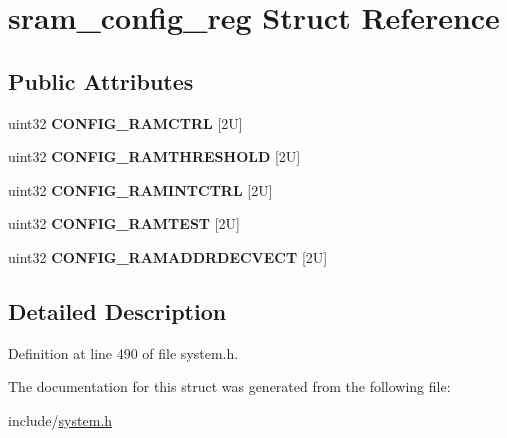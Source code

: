 \hypertarget{structsram__config__reg}{}\section{sram\+\_\+config\+\_\+reg Struct Reference}
\label{structsram__config__reg}
\subsection*{Public Attributes}
\begin{DoxyCompactItemize}
\item 
\mbox{\label{structsram__config__reg_ac6faa15604d9d8ac7da15f410c0e0f5f}} 
uint32 {\bfseries C\+O\+N\+F\+I\+G\+\_\+\+R\+A\+M\+C\+T\+RL} \mbox{[}2\+U\mbox{]}
\item 
\mbox{\label{structsram__config__reg_abdc48a061056e5477717b88781135c45}} 
uint32 {\bfseries C\+O\+N\+F\+I\+G\+\_\+\+R\+A\+M\+T\+H\+R\+E\+S\+H\+O\+LD} \mbox{[}2\+U\mbox{]}
\item 
\mbox{\label{structsram__config__reg_a2611c57e81e34f28e509f1ab8c3a0847}} 
uint32 {\bfseries C\+O\+N\+F\+I\+G\+\_\+\+R\+A\+M\+I\+N\+T\+C\+T\+RL} \mbox{[}2\+U\mbox{]}
\item 
\mbox{\label{structsram__config__reg_a543af38e7d50af7ba787b25a53d747a8}} 
uint32 {\bfseries C\+O\+N\+F\+I\+G\+\_\+\+R\+A\+M\+T\+E\+ST} \mbox{[}2\+U\mbox{]}
\item 
\mbox{\label{structsram__config__reg_a422b5b5cbfd882e797d24983e6c55b8e}} 
uint32 {\bfseries C\+O\+N\+F\+I\+G\+\_\+\+R\+A\+M\+A\+D\+D\+R\+D\+E\+C\+V\+E\+CT} \mbox{[}2\+U\mbox{]}
\end{DoxyCompactItemize}


\subsection{Detailed Description}


Definition at line 490 of file system.\+h.



The documentation for this struct was generated from the following file\+:\begin{DoxyCompactItemize}
\item 
include/\mbox{\hyperlink{system_8h}{system.\+h}}\end{DoxyCompactItemize}
